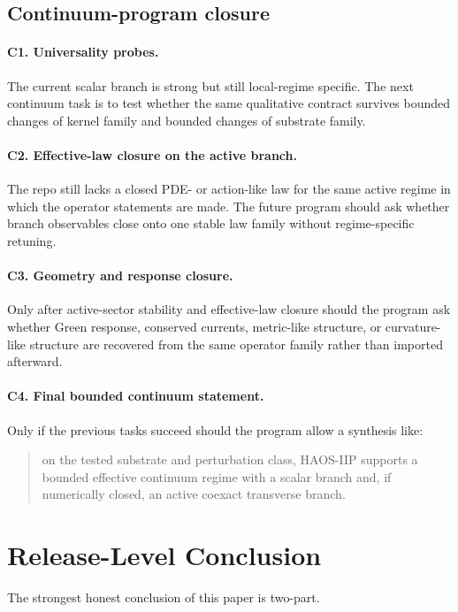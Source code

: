 \documentclass[11pt]{article}
\begin{document}
\subsection{Continuum-program closure}

\paragraph{C1. Universality probes.}
The current scalar branch is strong but still local-regime specific. The next continuum task is to test whether the same qualitative contract survives bounded changes of kernel family and bounded changes of substrate family.

\paragraph{C2. Effective-law closure on the active branch.}
The repo still lacks a closed PDE- or action-like law for the same active regime in which the operator statements are made. The future program should ask whether branch observables close onto one stable law family without regime-specific retuning.

\paragraph{C3. Geometry and response closure.}
Only after active-sector stability and effective-law closure should the program ask whether Green response, conserved currents, metric-like structure, or curvature-like structure are recovered from the same operator family rather than imported afterward.

\paragraph{C4. Final bounded continuum statement.}
Only if the previous tasks succeed should the program allow a synthesis like:
\begin{quote}
on the tested substrate and perturbation class, HAOS-IIP supports a bounded effective continuum regime with a scalar branch and, if numerically closed, an active coexact transverse branch.
\end{quote}

\section{Release-Level Conclusion}

The strongest honest conclusion of this paper is two-part.
\end{document}
